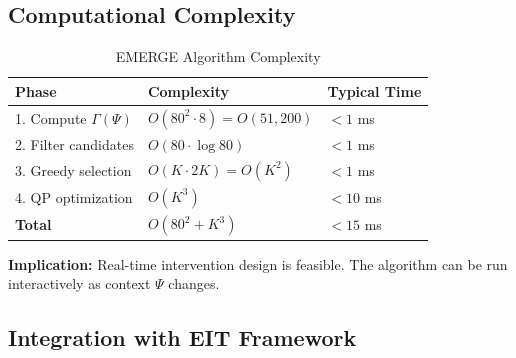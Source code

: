 \subsection{Computational Complexity}
\label{subsec:emp2-complexity}

\begin{table}[htbp]
\centering
\caption{EMERGE Algorithm Complexity}
\label{tab:complexity}
\renewcommand{\arraystretch}{1.3}
\begin{tabular}{@{}lll@{}}
\toprule
\textbf{Phase} & \textbf{Complexity} & \textbf{Typical Time} \\
\midrule
1. Compute $\Gamma(\Psi)$ & $O(80^2 \cdot 8) = O(51,200)$ & $< 1$ ms \\
2. Filter candidates & $O(80 \cdot \log 80)$ & $< 1$ ms \\
3. Greedy selection & $O(K \cdot 2K) = O(K^2)$ & $< 1$ ms \\
4. QP optimization & $O(K^3)$ & $< 10$ ms \\
\midrule
\textbf{Total} & $O(80^2 + K^3)$ & $< 15$ ms \\
\bottomrule
\end{tabular}
\end{table}

\textbf{Implication:} Real-time intervention design is feasible. The algorithm can be run interactively as context $\Psi$ changes.

\subsection{Integration with EIT Framework}
\label{subsec:emp2-integration}

